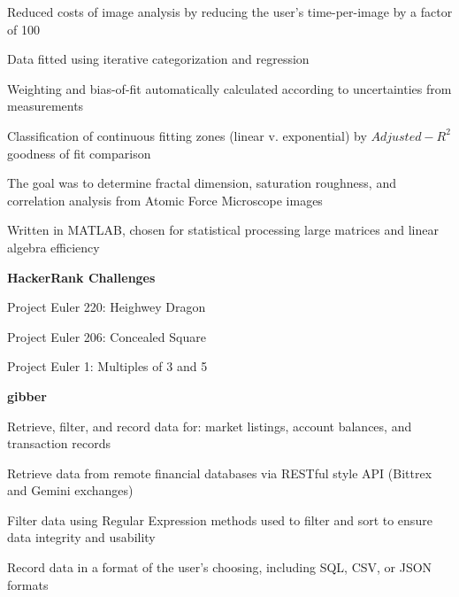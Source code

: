 \documentclass[letterpaper,final]{memoir}
\newcommand{\LargeSep}{\vspace{1.3em}}
\newcommand{\Sep}{\vspace{1.0em}}
\newcommand{\SmallSep}{\vspace{0.4em}}
\newcommand{\CVItem}[1]
	{\textbf{\color{Blue} #1}}
\begin{document}
\begin{compactitem}[\color{Blue}$\circ$]
   
    \SmallSep

    \item Reduced costs of image analysis by reducing the user's time-per-image by a factor of 100

    \item Data fitted using iterative categorization and regression

    \item Weighting and bias-of-fit automatically calculated according to uncertainties from measurements

    \item Classification of continuous fitting zones (linear v. exponential) by $Adjusted-R^2$ goodness of fit comparison

    \item The goal was to determine fractal dimension, saturation roughness, and correlation analysis from Atomic Force Microscope images

    \item Written in MATLAB, chosen for statistical processing large matrices and linear algebra efficiency
    \Sep

\end{compactitem}

\CVItem{HackerRank Challenges} 

\begin{compactitem}[\color{Blue}$\circ$]

    \SmallSep
    \item Project Euler 220:    Heighwey Dragon

    \item Project Euler 206:    Concealed Square

    \item Project Euler 1:      Multiples of 3 and 5

    \Sep
\end{compactitem}

\CVItem{gibber} 

\begin{compactitem}[\color{Blue}$\circ$]

    \SmallSep
    
    \item Retrieve, filter, and record data for: market listings, account balances, and transaction records
    
    \item Retrieve data from remote financial databases via RESTful style API (Bittrex and Gemini exchanges)
    
    \item Filter data using Regular Expression methods used to filter and sort to ensure data integrity and usability
    
    \item Record data in a format of the user's choosing, including SQL, CSV, or JSON formats
    
\end{compactitem}
\LargeSep
\end{document}

